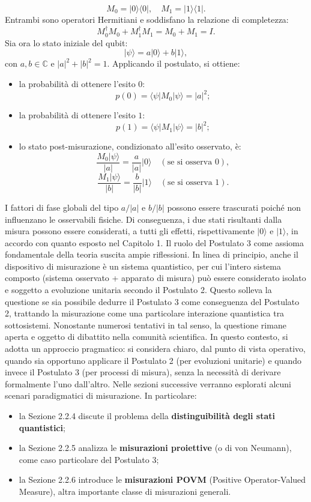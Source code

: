 \documentclass[a4paper,12pt]{report}
\theoremstyle{plain}
\begin{document}
\[ M_0 = |0\rangle \langle 0|, \quad M_1 = |1\rangle \langle 1|. \]
Entrambi sono operatori Hermitiani e soddisfano la relazione di completezza:
\[ M_0^\dagger M_0 + M_1^\dagger M_1 = M_0 + M_1 = I. \]
Sia ora lo stato iniziale del qubit:
\[ |\psi\rangle = a|0\rangle + b|1\rangle, \]
con \( a, b \in \mathbb{C} \) e \( |a|^2 + |b|^2 = 1 \). Applicando il postulato, si ottiene:
\begin{itemize}
    \item la probabilità di ottenere l'esito \( 0 \):
    \[ p(0) = \langle \psi | M_0 | \psi \rangle = |a|^2; \]

    \item la probabilità di ottenere l'esito \( 1 \):
    \[ p(1) = \langle \psi | M_1 | \psi \rangle = |b|^2; \]

    \item lo stato post-misurazione, condizionato all'esito osservato, è:
    \[ \frac{M_0 |\psi\rangle}{|a|} = \frac{a}{|a|} |0\rangle \quad (\text{se si osserva } 0), \]
    \[ \frac{M_1 |\psi\rangle}{|b|} = \frac{b}{|b|} |1\rangle \quad (\text{se si osserva } 1). \]
\end{itemize}
I fattori di fase globali del tipo \( a/|a| \) e \( b/|b| \) possono essere trascurati poiché non influenzano le osservabili fisiche. Di conseguenza, i due stati risultanti dalla misura possono essere considerati, a tutti gli effetti, rispettivamente \( |0\rangle \) e \( |1\rangle \), in accordo con quanto esposto nel Capitolo 1.
Il ruolo del Postulato 3 come assioma fondamentale della teoria suscita ampie riflessioni. In linea di principio, anche il dispositivo di misurazione è un sistema quantistico, per cui l'intero sistema composto (sistema osservato + apparato di misura) può essere considerato isolato e soggetto a evoluzione unitaria secondo il Postulato 2. Questo solleva la questione se sia possibile dedurre il Postulato 3 come conseguenza del Postulato 2, trattando la misurazione come una particolare interazione quantistica tra sottosistemi. Nonostante numerosi tentativi in tal senso, la questione rimane aperta e oggetto di dibattito nella comunità scientifica.
In questo contesto, si adotta un approccio pragmatico: si considera chiaro, dal punto di vista operativo, quando sia opportuno applicare il Postulato 2 (per evoluzioni unitarie) e quando invece il Postulato 3 (per processi di misura), senza la necessità di derivare formalmente l'uno dall'altro.
Nelle sezioni successive verranno esplorati alcuni scenari paradigmatici di misurazione. In particolare:
\begin{itemize}
    \item la Sezione 2.2.4 discute il problema della \textbf{distinguibilità degli stati quantistici};
    \item la Sezione 2.2.5 analizza le \textbf{misurazioni proiettive} (o di von Neumann), come caso particolare del Postulato 3;
    \item la Sezione 2.2.6 introduce le \textbf{misurazioni POVM} (Positive Operator-Valued Measure), altra importante classe di misurazioni generali.
\end{itemize}
\end{document}
